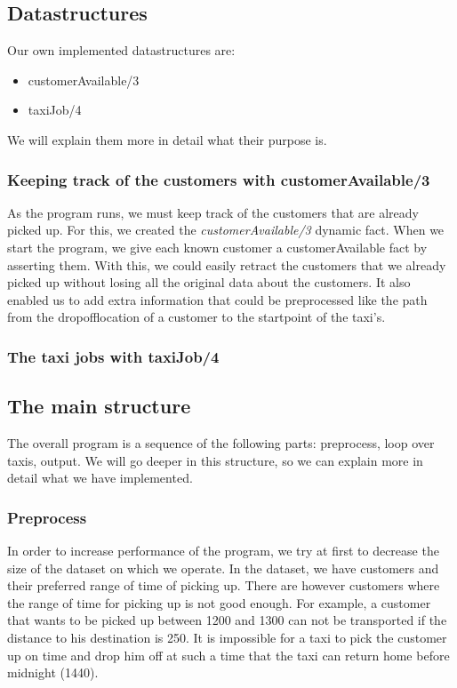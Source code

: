 \documentclass[10pt,a4paper]{article}
\begin{document}
\subsection{Datastructures}

Our own implemented datastructures are:
\begin{itemize}
\item customerAvailable/3
\item taxiJob/4
\end{itemize}
We will explain them more in detail what their purpose is.

\subsubsection{Keeping track of the customers with customerAvailable/3}

As the program runs, we must keep track of the customers that are already picked up. For this, we created the \textit{customerAvailable/3} dynamic fact. When we start the program, we give each known customer a customerAvailable fact by asserting them. With this, we could easily retract the customers that we already picked up without losing all the original data about the customers. It also enabled us to add extra information that could be preprocessed like the path from the dropofflocation of a customer to the startpoint of the taxi's.

\subsubsection{The taxi jobs with taxiJob/4}

\subsection{The main structure}

The overall program is a sequence of the following parts: preprocess, loop over taxis, output. We will go deeper in this structure, so we can explain more in detail what we have implemented.

\subsubsection{Preprocess}

In order to increase performance of the program, we try at first to decrease the size of the dataset on which we operate. In the dataset, we have customers and their preferred range of time of picking up. There are however customers where the range of time for picking up is not good enough. For example, a customer that wants to be picked up between 1200 and 1300 can not be transported if the distance to his destination is 250. It is impossible for a taxi to pick the customer up on time and drop him off at such a time that the taxi can return home before midnight (1440).
\end{document}
